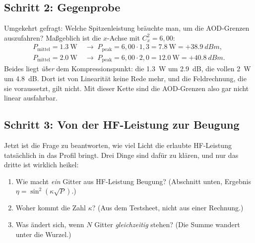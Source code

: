 \documentclass[11pt,a4paper]{article}
\newcommand{\crest}{\ensuremath{C}}
\begin{document}
\medskip
\noindent{}

\subsection{Schritt 2: Gegenprobe}

Umgekehrt gefragt: Welche Spitzenleistung bräuchte man, um die AOD-Grenzen
auszufahren? Maßgeblich ist die $x$-Achse mit $\crest_x^2=6{,}00$:
\begin{align}
  P_\mathrm{mittel} = \SI{1.3}{\watt} &\;\rightarrow\; P_\mathrm{peak} = 6{,}00\cdot1{,}3 = \SI{7.8}{\watt} = +\SI{38.9}{dBm},\\
  P_\mathrm{mittel} = \SI{2.0}{\watt} &\;\rightarrow\; P_\mathrm{peak} = 6{,}00\cdot2{,}0 = \SI{12.0}{\watt} = +\SI{40.8}{dBm}.
\end{align}
Beides liegt \emph{über} dem Kompressionspunkt: die \SI{1.3}{\watt} um
\SI{2.9}{\deci\bel}, die vollen \SI{2}{\watt} um \SI{4.8}{\deci\bel}. Dort
ist von Linearität keine Rede mehr, und die Feldrechnung, die sie voraussetzt,
gilt nicht. Mit dieser Kette sind die AOD-Grenzen also gar nicht linear
ausfahrbar.

\subsection{Schritt 3: Von der HF-Leistung zur Beugung}\label{sec:beugung}

Jetzt ist die Frage zu beantworten, wie viel Licht die erlaubte HF-Leistung
tatsächlich in das Profil bringt. Drei Dinge sind dafür zu klären, und nur
das dritte ist wirklich heikel:
\begin{enumerate}\itemsep0.15em
  \item Wie macht \emph{ein} Gitter aus HF-Leistung Beugung? (Abschnitt unten,
        Ergebnis $\eta=\sin^2(\kappa\sqrt{P})$.)
  \item Woher kommt die Zahl $\kappa$? (Aus dem Testsheet, nicht aus einer Rechnung.)
  \item Was ändert sich, wenn $N$ Gitter \emph{gleichzeitig} stehen?
        (Die Summe wandert unter die Wurzel.)
\end{enumerate}
\end{document}
